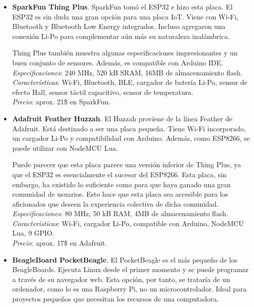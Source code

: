 \documentclass[12pt]{article}
\begin{document}
\begin{itemize}
		\item \textbf{SparkFun Thing Plus}. SparkFun tomó el ESP32 e hizo esta placa. El ESP32 es sin duda una gran opción para una placa IoT. Viene con Wi-Fi, Bluetooth y Bluetooth Low Energy integrados. Incluso agregaron una conexión Li-Po para complementar aún más su naturaleza inalámbrica.
		
		Thing Plus también muestra algunas especificaciones impresionantes y un buen conjunto de sensores. Además, es compatible con Arduino IDE. \\
		
		\textit{Especificaciones}: 240 MHz, 520 kB SRAM, 16MB de almacenamiento flash. \\
		
		\textit{Características}: Wi-Fi, Bluetooth, BLE, cargador de batería Li-Po, sensor de efecto Hall, sensor táctil capacitivo, sensor de temperatura. \\
		
		\textit{Precio}: aprox. 21\$ en SparkFun.\\
		
		\item \textbf{Adafruit Feather Huzzah}. El Huzzah proviene de la línea Feather de Adafruit. Está destinado a ser una placa pequeña. Tiene Wi-Fi incorporado, un cargador Li-Po y compatibilidad con Arduino. Además, como ESP8266, se puede utilizar con NodeMCU Lua.
		
		Puede parecer que esta placa parece una versión inferior de Thing Plus, ya que el ESP32 es esencialmente el sucesor del ESP8266. Esta placa, sin embargo, ha existido lo suficiente como para que haya ganado una gran comunidad de usuarios. Esto hace que esta placa sea accesible para los aficionados que deseen la experiencia colectiva de dicha comunidad. \\
		
		\textit{Especificaciones}: 80 MHz, 50 kB RAM, 4MB de almacenamiento flash. \\
		
		\textit{Características}: Wi-Fi, cargador Li-Po, compatible con Arduino, NodeMCU Lua, 9 GPIO.\\
		
		\textit{Precio}: aprox. 17\$ en Adafruit.\\
		
		\item \textbf{BeagleBoard PocketBeagle}. El PocketBeagle es el más pequeño de los BeagleBoards. Ejecuta Linux desde el primer momento y se puede programar a través de su navegador web. Esta opción, por tanto, se trataría de un ordenador, como lo es una Raspberry Pi, no un microcontrolador. Ideal para proyectos pequeños que necesitan los recursos de una computadora. 
		

\end{itemize}
\end{document}
